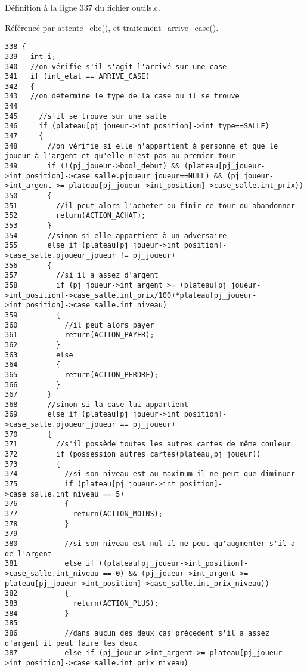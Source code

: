 D\'{e}finition \`{a} la ligne 337 du fichier outils.c.

R\'{e}f\'{e}renc\'{e} par attente\_\-clic(), et traitement\_\-arrive\_\-case().

\begin{Code}\begin{verbatim}338 {
339   int i;
340   //on vérifie s'il s'agit l'arrivé sur une case
341   if (int_etat == ARRIVE_CASE)
342   { 
343   //on détermine le type de la case ou il se trouve
344   
345     //s'il se trouve sur une salle
346     if (plateau[pj_joueur->int_position]->int_type==SALLE)
347     {
348       //on vérifie si elle n'appartient à personne et que le joueur à l'argent et qu'elle n'est pas au premier tour
349       if (!(pj_joueur->bool_debut) && (plateau[pj_joueur->int_position]->case_salle.pjoueur_joueur==NULL) && (pj_joueur->int_argent >= plateau[pj_joueur->int_position]->case_salle.int_prix))
350       {
351         //il peut alors l'acheter ou finir ce tour ou abandonner
352         return(ACTION_ACHAT);
353       }
354       //sinon si elle appartient à un adversaire
355       else if (plateau[pj_joueur->int_position]->case_salle.pjoueur_joueur != pj_joueur)
356       {
357         //si il a assez d'argent
358         if (pj_joueur->int_argent >= (plateau[pj_joueur->int_position]->case_salle.int_prix/100)*plateau[pj_joueur->int_position]->case_salle.int_niveau)
359         {
360           //il peut alors payer
361           return(ACTION_PAYER);
362         }
363         else
364         {
365           return(ACTION_PERDRE);
366         }
367       }
368       //sinon si la case lui appartient
369       else if (plateau[pj_joueur->int_position]->case_salle.pjoueur_joueur == pj_joueur)
370       {
371         //s'il possède toutes les autres cartes de même couleur
372         if (possession_autres_cartes(plateau,pj_joueur))
373         {
374           //si son niveau est au maximum il ne peut que diminuer
375           if (plateau[pj_joueur->int_position]->case_salle.int_niveau == 5)
376           {
377             return(ACTION_MOINS);
378           }
379           
380           //si son niveau est nul il ne peut qu'augmenter s'il a de l'argent
381           else if ((plateau[pj_joueur->int_position]->case_salle.int_niveau == 0) && (pj_joueur->int_argent >= plateau[pj_joueur->int_position]->case_salle.int_prix_niveau))
382           {
383             return(ACTION_PLUS);
384           }
385           
386           //dans aucun des deux cas précedent s'il a assez d'argent il peut faire les deux
387           else if (pj_joueur->int_argent >= plateau[pj_joueur->int_position]->case_salle.int_prix_niveau)

\end{verbatim}
\end{Code}
